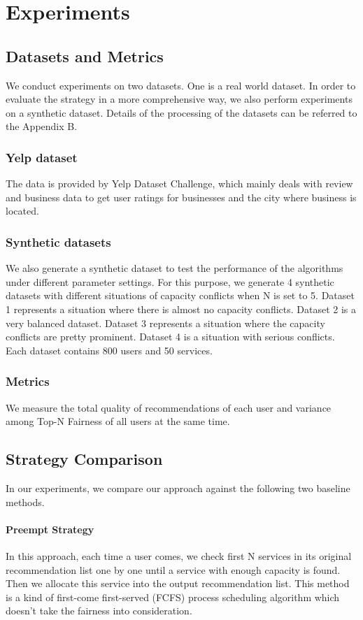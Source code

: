 \section{Experiments}
\subsection{Datasets and Metrics}
We conduct experiments on two datasets. One is a real world dataset.
In order to evaluate the strategy in a more comprehensive way, we
also perform experiments on a synthetic dataset. Details of the
processing of the datasets can be referred to the Appendix B.
\subsubsection{Yelp dataset}
The data is provided by Yelp Dataset Challenge, which mainly deals with review and business data to get user ratings for businesses and the city where business is located.
\subsubsection{Synthetic datasets}
We also generate a synthetic dataset to test the performance of the algorithms under different parameter settings. For this purpose, we generate 4 synthetic datasets with different situations of capacity conflicts when N is set to 5. Dataset 1 represents a situation where there is almost no capacity conflicts. Dataset 2 is a very balanced dataset. Dataset 3 represents a situation where the capacity conflicts are pretty prominent. Dataset 4 is a situation with serious conflicts. Each dataset contains 800 users and 50 services.
\subsubsection{Metrics}
 We measure the total quality of recommendations of each user and variance among Top-N Fairness of all users at the same time.
\subsection{Strategy Comparison}
In our experiments,  we compare our approach against the following two baseline methods.

\paragraph{Preempt Strategy} In this approach, each time a user comes, we check first N services in its original recommendation list one by one until a service with enough capacity is found. Then we allocate this service into the output recommendation list. This method is a kind of first-come first-served (FCFS) process scheduling algorithm which doesn't take the fairness into consideration.

